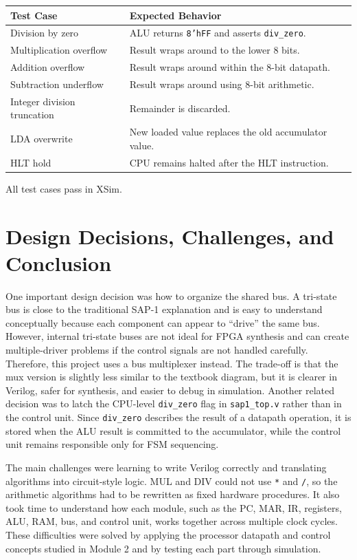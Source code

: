 \documentclass[12pt,a4paper]{article}
\begin{document}
\begin{center}
\begin{tabular}{l l}
\toprule
Test Case & Expected Behavior \\
\midrule
Division by zero & ALU returns \texttt{8'hFF} and asserts \texttt{div\_zero}. \\
Multiplication overflow & Result wraps around to the lower 8 bits. \\
Addition overflow & Result wraps around within the 8-bit datapath. \\
Subtraction underflow & Result wraps around using 8-bit arithmetic. \\
Integer division truncation & Remainder is discarded. \\
LDA overwrite & New loaded value replaces the old accumulator value. \\
HLT hold & CPU remains halted after the HLT instruction. \\
\bottomrule
\end{tabular}
\end{center}

All test cases pass in XSim.

\section{Design Decisions, Challenges, and Conclusion}

One important design decision was how to organize the shared bus. A tri-state bus is close to the traditional SAP-1 explanation and is easy to understand conceptually because each component can appear to ``drive'' the same bus. However, internal tri-state buses are not ideal for FPGA synthesis and can create multiple-driver problems if the control signals are not handled carefully. Therefore, this project uses a bus multiplexer instead. The trade-off is that the mux version is slightly less similar to the textbook diagram, but it is clearer in Verilog, safer for synthesis, and easier to debug in simulation. Another related decision was to latch the CPU-level \texttt{div\_zero} flag in \texttt{sap1\_top.v} rather than in the control unit. Since \texttt{div\_zero} describes the result of a datapath operation, it is stored when the ALU result is committed to the accumulator, while the control unit remains responsible only for FSM sequencing.

The main challenges were learning to write Verilog correctly and translating algorithms into circuit-style logic. MUL and DIV could not use \texttt{*} and \texttt{/}, so the arithmetic algorithms had to be rewritten as fixed hardware procedures. It also took time to understand how each module, such as the PC, MAR, IR, registers, ALU, RAM, bus, and control unit, works together across multiple clock cycles. These difficulties were solved by applying the processor datapath and control concepts studied in Module 2 and by testing each part through simulation.
\end{document}
